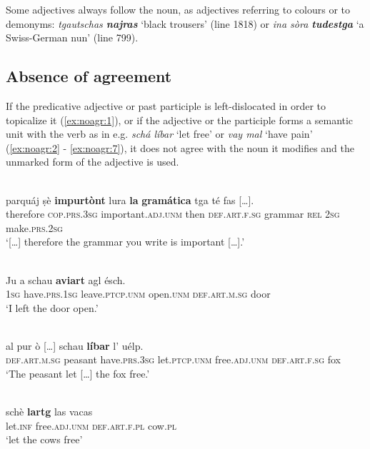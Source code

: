 Some adjectives always follow the noun, as adjectives referring to colours or to demonyms: \textit{tgautschas \textbf{najras}} `black trousers' (line 1818) or \textit{ina sòra \textbf{tudestga}} `a Swiss-German nun' (line 799).

\subsection{Absence of agreement}
If the predicative adjective or past participle is left-dislocated in order to topicalize it (\ref{ex:noagr:1}), or if the adjective or the participle forms a semantic unit with the verb as in e.g. \textit{schá líbar} `let free' or \textit{vay mal} `have pain' (\ref{ex:noagr:2} - \ref{ex:noagr:7}), it does not agree with the noun it modifies and the unmarked form of the adjective is used.

\ea\label{ex:noagr:1}
\\
\gll   [...] parquáj ṣè \textbf{impurtònt} lura \textbf{la} \textbf{gramática} tga té fas […]. \\
     {} therefore \textsc{cop.prs.3sg} important.\textsc{adj.unm} then \textsc{def.art.f.sg} grammar \textsc{rel} \textsc{2sg} make.\textsc{prs.2sg}\\
\glt `[…] therefore the grammar you write is important […].'
\z

\ea\label{ex:noagr:2}
\\
\gll Ju a schau \textbf{aviart} agl ésch.   \\
 \textsc{1sg} have.\textsc{prs.1sg} leave.\textsc{ptcp.unm} open.\textsc{unm} \textsc{def.art.m.sg} door\\
\glt `I left the door open.'
\z

\ea\label{ex:noagr:3}
\\
\gll    [...] al pur ò […] schau \textbf{líbar} l’ uélp.\\
     {} \textsc{def.art.m.sg} peasant have.\textsc{prs.3sg} {} let.\textsc{ptcp.unm} free.\textsc{adj.unm} \textsc{def.art.f.sg} fox\\
\glt `The peasant let […] the fox free.'
\z

\ea

\\
\gll schè \textbf{lartg} las vacas\\
let.\textsc{inf} free.\textsc{adj.unm} \textsc{def.art.f.pl} cow.\textsc{pl}\\
\glt `let the cows free'
\z

